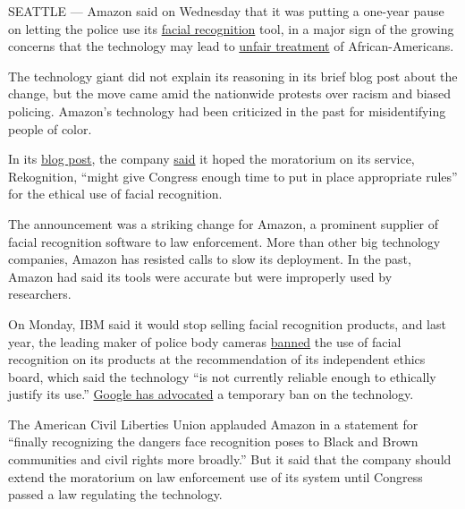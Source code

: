SEATTLE --- Amazon said on Wednesday that it was putting a one-year
pause on letting the police use its
\href{https://www.nytimes3xbfgragh.onion/2019/05/20/technology/amazon-facial-recognition.html}{facial
recognition} tool, in a major sign of the growing concerns that the
technology may lead to
\href{https://www.nytimes3xbfgragh.onion/2018/02/09/technology/facial-recognition-race-artificial-intelligence.html}{unfair
treatment} of African-Americans.

The technology giant did not explain its reasoning in its brief blog
post about the change, but the move came amid the nationwide protests
over racism and biased policing. Amazon's technology had been criticized
in the past for misidentifying people of color.

In its
\href{https://blog.aboutamazon.com/policy/we-are-implementing-a-one-year-moratorium-on-police-use-of-rekognition}{blog
post}, the company
\href{https://blog.aboutamazon.com/policy/we-are-implementing-a-one-year-moratorium-on-police-use-of-rekognition}{said}
it hoped the moratorium on its service, Rekognition, ``might give
Congress enough time to put in place appropriate rules'' for the ethical
use of facial recognition.

The announcement was a striking change for Amazon, a prominent supplier
of facial recognition software to law enforcement. More than other big
technology companies, Amazon has resisted calls to slow its deployment.
In the past, Amazon had said its tools were accurate but were improperly
used by researchers.

On Monday, IBM said it would stop selling facial recognition products,
and last year, the leading maker of police body cameras
\href{https://www.nytimes3xbfgragh.onion/2019/06/27/opinion/police-cam-facial-recognition.html}{banned}
the use of facial recognition on its products at the recommendation of
its independent ethics board, which said the technology ``is not
currently reliable enough to ethically justify its use.''
\href{https://www.nytimes3xbfgragh.onion/2020/06/09/technology/facial-recognition-software.html}{Google
has advocated} a temporary ban on the technology.

The American Civil Liberties Union applauded Amazon in a statement for
``finally recognizing the dangers face recognition poses to Black and
Brown communities and civil rights more broadly.'' But it said that the
company should extend the moratorium on law enforcement use of its
system until Congress passed a law regulating the technology.

